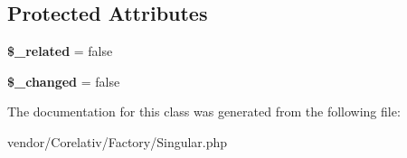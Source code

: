 \subsection*{Protected Attributes}
\begin{DoxyCompactItemize}
\item 
\hypertarget{classSingular_a918c7ec54f02b94c3ec5248d5b182b05}{
{\bfseries \$\_\-related} = false}
\label{classSingular_a918c7ec54f02b94c3ec5248d5b182b05}

\item 
\hypertarget{classSingular_a1ce1f27a9b9b8a7f87e9097e205bbcd5}{
{\bfseries \$\_\-changed} = false}
\label{classSingular_a1ce1f27a9b9b8a7f87e9097e205bbcd5}

\end{DoxyCompactItemize}


The documentation for this class was generated from the following file:\begin{DoxyCompactItemize}
\item 
vendor/Corelativ/Factory/Singular.php\end{DoxyCompactItemize}

